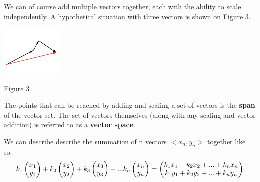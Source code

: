 \documentclass{article}
\begin{document}
\linebreak
\linebreak
\linebreak
\begin{minipage}[c]{.5\linewidth}
	\par \noindent We can of course add multiple vectors together, each with the ability to scale independently. A hypothetical situation with three vectors is shown on Figure 3.
\end{minipage}%
\begin{minipage}[c]{.5\linewidth}
\begin{center}
	\includegraphics[width=3cm]{matrix-scaling-3.png}
\end{center}
\begin{center}
	Figure 3
\end{center}
\end{minipage}
\newline
\newline
\newline
\par\noindent The points that can be reached by adding and scaling a set of vectors is the \textbf{span} of the vector set. The set of vectors themselves (along with any scaling and vector addition) is referred to as a \textbf{vector space}.
\newpage
\par \noindent We can describe describe the summation of n vectors \(<x_n, y_n>\) together like so:
\[
k_1
\left(\begin{array}{@{}c@{}}
	x_1 \\
	y_1 \\
\end{array}\right) + 
k_2
\left(\begin{array}{@{}c@{}}
	x_2 \\
	y_2 \\
\end{array}\right) + 
k_3
\left(\begin{array}{@{}c@{}}
	x_3 \\
	y_3 \\
\end{array}\right) + 
... 
k_n
\left(\begin{array}{@{}c@{}}
	x_n \\
	y_n \\
\end{array}\right) =
\left(\begin{array}{@{}c@{}}
	k_1 x_1 + k_2 x_2 + ... + k_n x_n \\
	k_1 y_1 + k_2 y_2 + ... + k_n y_n \\
\end{array}\right) 
\]
\end{document}
